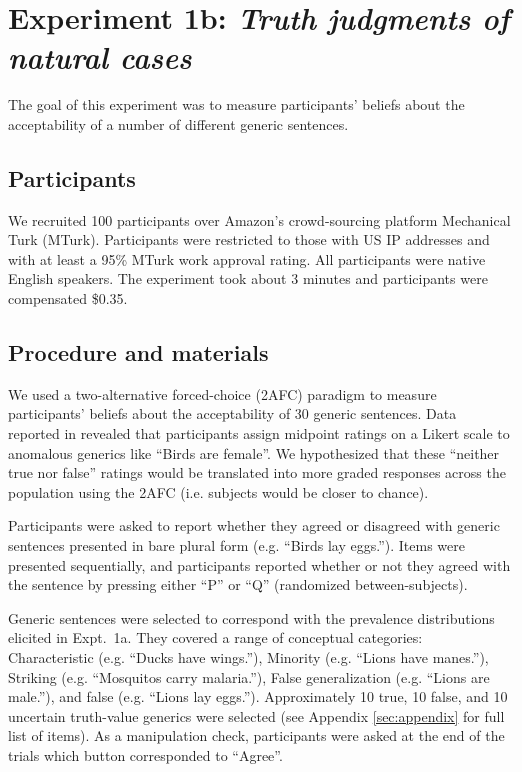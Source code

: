 \documentclass[10pt,letterpaper]{article}
\begin{document}
\section{Experiment 1b: \emph{Truth judgments of natural cases}}

The goal of this experiment was to measure participants' beliefs about the acceptability of a number of different generic sentences. 

\subsection{Participants}

We recruited 100 participants over Amazon's crowd-sourcing platform Mechanical Turk (MTurk).  Participants were restricted to those with US IP addresses and with at least a 95\% MTurk work approval rating. All participants were native English speakers. The experiment took about 3 minutes and participants were compensated \$0.35.

\subsection{Procedure and materials}

We used a two-alternative forced-choice (2AFC) paradigm to measure participants' beliefs about the acceptability of 30 generic sentences. 
Data reported in  revealed that participants assign midpoint ratings on a Likert scale to anomalous generics like ``Birds are female''. 
We hypothesized that these ``neither true nor false'' ratings would be translated into more graded responses across the population using the 2AFC (i.e. subjects would be closer to chance).

Participants were asked to report whether they agreed or disagreed with generic sentences presented in bare plural form (e.g. ``Birds lay eggs.''). 
Items were presented sequentially, and participants reported whether or not they agreed with the sentence by pressing either ``P'' or ``Q'' (randomized between-subjects). 

Generic sentences were selected to correspond with the prevalence distributions elicited in Expt.~1a. 
They covered a range of conceptual categories: Characteristic (e.g. ``Ducks have wings.''), Minority (e.g. ``Lions have manes.''), Striking (e.g. ``Mosquitos carry malaria.''), False generalization (e.g. ``Lions are male.''), and false (e.g. ``Lions lay eggs.'').
Approximately 10 true, 10 false, and 10 uncertain truth-value generics were selected (see Appendix \ref{sec:appendix} for full list of items).
As a manipulation check, participants were asked at the end of the trials which button corresponded to ``Agree''.
\end{document}

